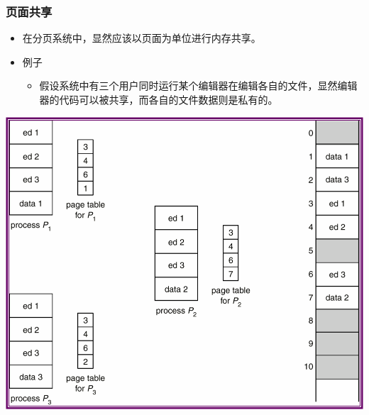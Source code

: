 \documentclass[CJKutf8,xcolor=pdftex,dvipsnames,table]{beamer}
\begin{document}
\begin{CJK*}{UTF8}{song}
  \begin{frame}
  \frametitle{页面共享} \pause
  \renewcommand{\thefootnote}{\fnsymbol{footnote}}
  \begin{itemize}
  \item{在分页系统中，显然应该以页面为单位进行内存共享。} \pause
  \item{例子} \pause
    \begin{itemize}
    \item{假设系统中有三个用户同时运行某个编辑器在编辑各自的文件，显然编辑器的代码可以被共享，而各自的文件数据则是私有的。} \pause
    \end{itemize}
  \end{itemize}
  \begin{center}
  \includegraphics[scale=.3]{v6f9-16}
  \end{center}
  \end{frame}
  

\end{CJK*}
\end{document}
